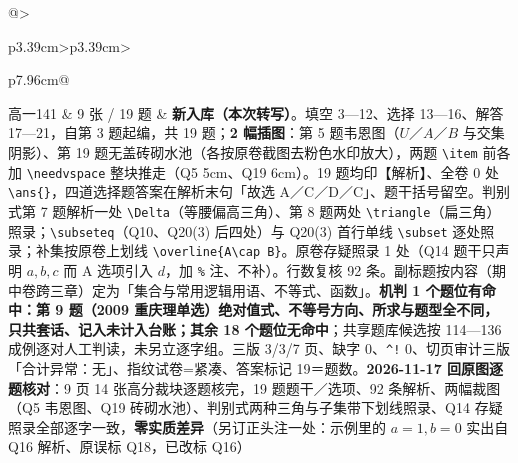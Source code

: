 \documentclass[a4paper,11pt]{article}
\begin{document}
\begin{xltabular}{\textwidth}{@{}>{\raggedright\arraybackslash}p{3.39cm}>{\centering\arraybackslash}p{3.39cm}>{\raggedright\arraybackslash}p{7.96cm}@{}}
高一141 & 9 张 / 19 题 & \textbf{新入库（本次转写）}。填空 3---12、选择 13---16、解答 17---21，自第 3 题起编，共 19 题；\textbf{2 幅插图}：第 5 题韦恩图（\(U\)／\(A\)／\(B\) 与交集阴影）、第 19 题无盖砖砌水池（各按原卷截图去粉色水印放大），两题 \texttt{\textbackslash{}item} 前各加 \texttt{\textbackslash{}needvspace} 整块推走（Q5 5cm、Q19 6cm）。19 题均印【解析】、全卷 0 处 \texttt{\textbackslash{}ans\{\}}，四道选择题答案在解析末句「故选 A／C／D／C」、题干括号留空。判别式第 7 题解析一处 \texttt{\textbackslash{}Delta}（等腰偏高三角）、第 8 题两处 \texttt{\textbackslash{}triangle}（扁三角）照录；\texttt{\textbackslash{}subseteq}（Q10、Q20(3) 后四处）与 Q20(3) 首行单线 \texttt{\textbackslash{}subset} 逐处照录；补集按原卷上划线 \texttt{\textbackslash{}overline\{A\textbackslash{}cap\ B\}}。原卷存疑照录 1 处（Q14 题干只声明 \(a,b,c\) 而 A 选项引入 \(d\)，加 \texttt{\%} 注、不补）。行数复核 92 条。副标题按内容（期中卷跨三章）定为「集合与常用逻辑用语、不等式、函数」。\textbf{机判 1 个题位有命中：第 9 题（2009 重庆理单选）绝对值式、不等号方向、所求与题型全不同，只共套话、记入未计入台账；其余 18 个题位无命中}；共享题库候选按 114---136 成例逐对人工判读，未另立逐字组。三版 3/3/7 页、缺字 0、\texttt{\^{}!} 0、切页审计三版「合计异常：无」、指纹试卷=紧凑、答案标记 19＝题数。\textbf{2026-11-17 回原图逐题核对}：9 页 14 张高分裁块逐题核完，19 题题干／选项、92 条解析、两幅裁图（Q5 韦恩图、Q19 砖砌水池）、判别式两种三角与子集带下划线照录、Q14 存疑照录全部逐字一致，\textbf{零实质差异}（另订正头注一处：示例里的 \(a=\allowbreak 1,b=\allowbreak 0\) 实出自 Q16 解析、原误标 Q18，已改标 Q16） \\ \addlinespace[1pt]

\end{xltabular}
\end{document}
